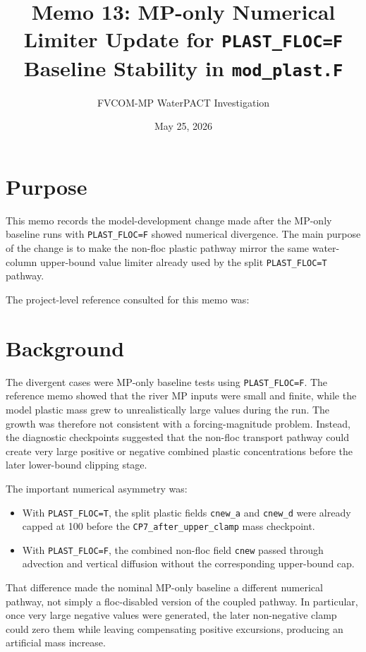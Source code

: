 \documentclass[11pt]{article}
\title{Memo 13: MP-only Numerical Limiter Update for \texttt{PLAST\_FLOC=F}\\
       Baseline Stability in \texttt{mod\_plast.F}}
\author{FVCOM-MP WaterPACT Investigation}
\date{May 25, 2026}
\begin{document}
\sloppy
\maketitle

\section*{Purpose}

This memo records the model-development change made after the MP-only
baseline runs with \texttt{PLAST\_FLOC=F} showed numerical divergence.  The
main purpose of the change is to make the non-floc plastic pathway mirror the
same water-column upper-bound value limiter already used by the split
\texttt{PLAST\_FLOC=T} pathway.

The project-level reference consulted for this memo was:
\begin{quote}
\end{quote}

\section*{Background}

The divergent cases were MP-only baseline tests using
\texttt{PLAST\_FLOC=F}.  The reference memo showed that the river MP inputs
were small and finite, while the model plastic mass grew to unrealistically
large values during the run.  The growth was therefore not consistent with a
forcing-magnitude problem.  Instead, the diagnostic checkpoints suggested that
the non-floc transport pathway could create very large positive or negative
combined plastic concentrations before the later lower-bound clipping stage.

The important numerical asymmetry was:
\begin{itemize}
  \item With \texttt{PLAST\_FLOC=T}, the split plastic fields
  \texttt{cnew\_a} and \texttt{cnew\_d} were already capped at 100 before the
  \texttt{CP7\_after\_upper\_clamp} mass checkpoint.
  \item With \texttt{PLAST\_FLOC=F}, the combined non-floc field
  \texttt{cnew} passed through advection and vertical diffusion without the
  corresponding upper-bound cap.
\end{itemize}

That difference made the nominal MP-only baseline a different numerical
pathway, not simply a floc-disabled version of the coupled pathway.  In
particular, once very large negative values were generated, the later
non-negative clamp could zero them while leaving compensating positive
excursions, producing an artificial mass increase.
\end{document}
